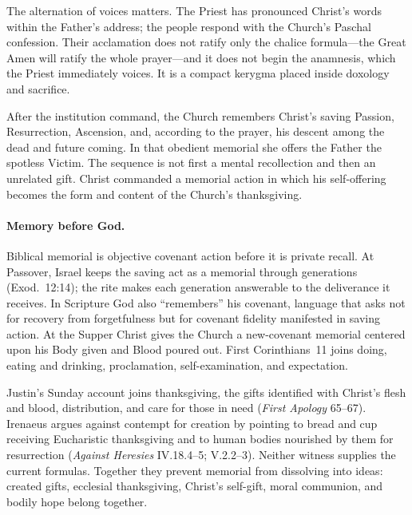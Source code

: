 The alternation of voices matters. The Priest has pronounced Christ's words within the Father's address; the people respond with the Church's Paschal confession. Their acclamation does not ratify only the chalice formula---the Great Amen will ratify the whole prayer---and it does not begin the anamnesis, which the Priest immediately voices. It is a compact kerygma placed inside doxology and sacrifice.


After the institution command, the Church remembers Christ's saving Passion, Resurrection, Ascension, and, according to the prayer, his descent among the dead and future coming. In that obedient memorial she offers the Father the spotless Victim. The sequence is not first a mental recollection and then an unrelated gift. Christ commanded a memorial action in which his self-offering becomes the form and content of the Church's thanksgiving.

\paragraph{Memory before God.}
Biblical memorial is objective covenant action before it is private recall. At Passover, Israel keeps the saving act as a memorial through generations (Exod.~12:14); the rite makes each generation answerable to the deliverance it receives. In Scripture God also ``remembers'' his covenant, language that asks not for recovery from forgetfulness but for covenant fidelity manifested in saving action. At the Supper Christ gives the Church a new-covenant memorial centered upon his Body given and Blood poured out. First Corinthians~11 joins doing, eating and drinking, proclamation, self-examination, and expectation.

Justin's Sunday account joins thanksgiving, the gifts identified with Christ's flesh and blood, distribution, and care for those in need (\emph{First Apology} 65--67). Irenaeus argues against contempt for creation by pointing to bread and cup receiving Eucharistic thanksgiving and to human bodies nourished by them for resurrection (\emph{Against Heresies} IV.18.4--5; V.2.2--3). Neither witness supplies the current formulas. Together they prevent memorial from dissolving into ideas: created gifts, ecclesial thanksgiving, Christ's self-gift, moral communion, and bodily hope belong together.

